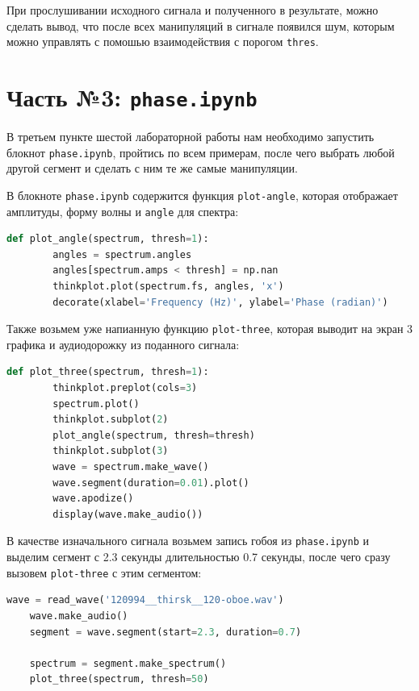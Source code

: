\documentclass[a4paper]{article}
\begin{document}
            При прослушивании исходного сигнала и полученного в результате, можно сделать вывод, что после всех манипуляций в сигнале появился шум, которым можно управлять с помошью взаимодействия с порогом \texttt{thres}.
            
    \newpage
        \section{Часть №3: \texttt{phase.ipynb}}
            В третьем пункте шестой лабораторной работы нам необходимо запустить блокнот \texttt{phase.ipynb}, пройтись по всем примерам, после чего выбрать любой другой сегмент и сделать с ним те же самые манипуляции.
            
            В блокноте \texttt{phase.ipynb} содержится функция \texttt{plot-angle}, которая отображает амплитуды, форму волны и \texttt{angle} для спектра:
            
\begin{lstlisting}[language=Python, caption= Функция \texttt{plot-angle}]
    def plot_angle(spectrum, thresh=1):
        angles = spectrum.angles
        angles[spectrum.amps < thresh] = np.nan
        thinkplot.plot(spectrum.fs, angles, 'x')
        decorate(xlabel='Frequency (Hz)', ylabel='Phase (radian)')
\end{lstlisting} 
            
            Также возьмем уже напианную функцию \texttt{plot-three}, которая выводит на экран 3 графика и аудиодорожку из поданного сигнала:
            
\begin{lstlisting}[language=Python, caption= Функция \texttt{plot-three}]
    def plot_three(spectrum, thresh=1):
        thinkplot.preplot(cols=3)
        spectrum.plot()
        thinkplot.subplot(2)
        plot_angle(spectrum, thresh=thresh)
        thinkplot.subplot(3)
        wave = spectrum.make_wave()
        wave.segment(duration=0.01).plot()
        wave.apodize()
        display(wave.make_audio())
\end{lstlisting} 
            
            В качестве изначального сигнала возьмем запись гобоя из \texttt{phase.ipynb} и выделим сегмент с 2.3 секунды длительностью 0.7 секунды, после чего сразу вызовем \texttt{plot-three} с этим сегментом:
            
\begin{lstlisting}[language=Python, caption= Вызов \texttt{plot-three} с \texttt{spectrum}]
    wave = read_wave('120994__thirsk__120-oboe.wav')
    wave.make_audio()
    segment = wave.segment(start=2.3, duration=0.7)
    
    spectrum = segment.make_spectrum()
    plot_three(spectrum, thresh=50)
\end{lstlisting} 
            
\end{document}
